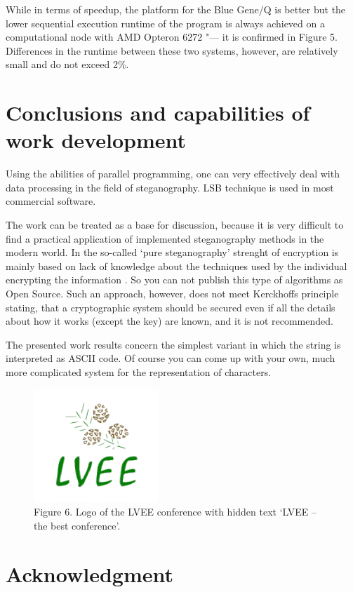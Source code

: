 \documentclass[10pt, a5paper]{article}
\begin{document}
While in terms of speedup, the platform for the Blue Gene/Q is better but the lower sequential execution runtime of the program is always achieved on a computational node with AMD Opteron 6272 "--- it is confirmed in Figure 5. Differences in the runtime between these two systems, however, are relatively small and do not exceed 2\%.

\section{Conclusions and capabilities of work development}

Using the abilities of parallel programming, one  can very effectively deal with data processing in the field of steganography. LSB technique is used in most commercial software.

The work can be treated as a base for discussion, because it is very difficult to find a practical application of implemented steganography methods in the modern world. In the so-called ‘pure steganography’ strenght of encryption is mainly based on lack of knowledge about the techniques used by the individual encrypting the information \footnotemark[7]. So you can not publish this type of algorithms as Open Source. Such an approach, however, does not meet Kerckhoffs principle \footnotemark[10] stating, that a cryptographic system should be secured even if all the details about how it works (except the key) are known, and it is not recommended.

The presented work results concern the simplest variant in which the string is interpreted as ASCII code. Of course you can come up with your own, much more complicated system for the representation of characters.

\begin{figure}[h!]
  \centering
    \includegraphics{103_2014_w_Kwiatkowska_lvee.png}\\
Figure 6. Logo of the LVEE conference with hidden text ‘LVEE – the best conference’.
\end{figure}

\section*{Acknowledgment}
\end{document}

